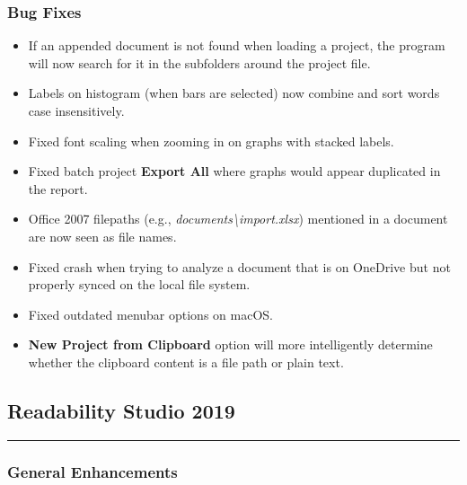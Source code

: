 \documentclass[
]{book}
\providecommand{\tightlist}{%
  \setlength{\itemsep}{0pt}\setlength{\parskip}{0pt}}
\theoremstyle{definition}
\theoremstyle{definition}
\theoremstyle{definition}
\theoremstyle{definition}
\theoremstyle{remark}
\begin{document}
\hypertarget{bug-fixes}{%
\subsubsection*{Bug Fixes}\label{bug-fixes}}

\begin{itemize}
\tightlist
\item
  If an appended document is not found when loading a project, the program will now search for it in the subfolders around the project file.
\item
  Labels on histogram (when bars are selected) now combine and sort words case insensitively.
\item
  Fixed font scaling when zooming in on graphs with stacked labels.
\item
  Fixed batch project \textbf{Export All} where graphs would appear duplicated in the report.
\item
  Office 2007 filepaths (e.g., \emph{documents\textbackslash import.xlsx}) mentioned in a document are now seen as file names.
\item
  Fixed crash when trying to analyze a document that is on OneDrive but not properly synced on the local file system.
\item
  Fixed outdated menubar options on macOS.
\item
  \textbf{New Project from Clipboard} option will more intelligently determine whether the clipboard content is a file path or plain text.
\end{itemize}

\hypertarget{readability-studio-2019}{%
\subsection*{Readability Studio 2019}\label{readability-studio-2019}}

\begin{center}\rule{0.5\linewidth}{0.5pt}\end{center}

\hypertarget{general-enhancements-1}{%
\subsubsection*{General Enhancements}\label{general-enhancements-1}}
\end{document}

